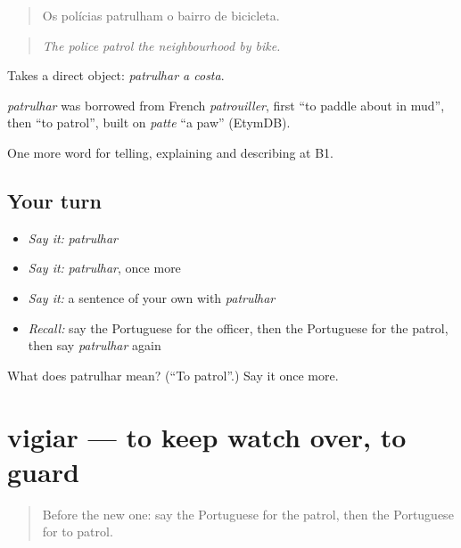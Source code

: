 \begin{quote}
Os polícias patrulham o bairro de bicicleta.
\end{quote}

\begin{quote}
\emph{The police patrol the neighbourhood by bike.}
\end{quote}

Takes a direct object: \emph{patrulhar a costa}.

\begin{cousinweb}
\emph{patrulhar} was borrowed from French \emph{patrouiller}, first \textquotedblleft{}to paddle about in mud\textquotedblright{}, then \textquotedblleft{}to patrol\textquotedblright{}, built on \emph{patte} \textquotedblleft{}a paw\textquotedblright{} (EtymDB).
\end{cousinweb}

\begin{grammarlens}[title={What you've built}]
One more word for telling, explaining and describing at B1.
\end{grammarlens}

\subsection*{Your turn}
\begin{itemize}
\raggedright
  \item \emph{Say it:} \emph{patrulhar}
  \item \emph{Say it:} \emph{patrulhar}, once more
  \item \emph{Say it:} a sentence of your own with \emph{patrulhar}
  \item \emph{Recall:} say the Portuguese for the officer, then the Portuguese for the patrol, then say \emph{patrulhar} again
\end{itemize}

\begin{tcolorbox}[breakable,colback=teal!4,colframe=teal!35!black,title={Before you move on}]
What does patrulhar mean? (\textquotedblleft{}To patrol\textquotedblright{}.) Say it once more.
\end{tcolorbox}
\section[vigiar]{vigiar — to keep watch over, to guard}

\label{lesson:PT-C293-vigiar}



\begin{quote}
Before the new one: say the Portuguese for the patrol, then the Portuguese for to patrol.
\end{quote}

